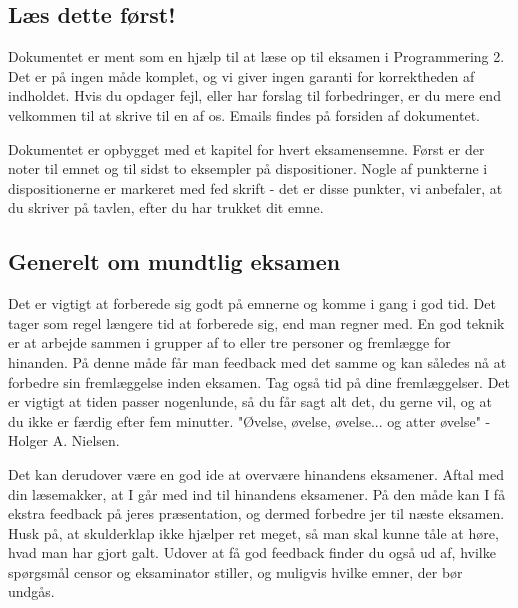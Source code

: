 \subsection{Læs dette først!}

Dokumentet er ment som en hjælp til at læse op til eksamen i Programmering 2. Det er på ingen måde komplet, og vi giver ingen garanti for korrektheden af indholdet. Hvis du opdager fejl, eller har forslag til forbedringer, er du mere end velkommen til at skrive til en af os. Emails findes på forsiden af dokumentet.

Dokumentet er opbygget med et kapitel for hvert eksamensemne. Først er der noter til emnet og til sidst to eksempler på dispositioner. Nogle af punkterne i dispositionerne er markeret med fed skrift - det er disse punkter, vi anbefaler, at du skriver på tavlen, efter du har trukket dit emne.

\subsection{Generelt om mundtlig eksamen}
Det er vigtigt at forberede sig godt på emnerne og komme i gang i god tid. Det tager som regel længere tid at forberede sig, end man regner med. En god teknik er at arbejde sammen i grupper af to eller tre personer og fremlægge for hinanden. På denne måde får man feedback med det samme og kan således nå at forbedre sin fremlæggelse inden eksamen. Tag også tid på dine fremlæggelser. Det er vigtigt at tiden passer nogenlunde, så du får sagt alt det, du gerne vil, og at du ikke er færdig efter fem minutter. "Øvelse, øvelse, øvelse... og atter øvelse" - Holger A. Nielsen.

Det kan derudover være en god ide at overvære hinandens eksamener. Aftal med din læsemakker, at I går med ind til hinandens eksamener. På den måde kan I få ekstra feedback på jeres præsentation, og dermed forbedre jer til næste eksamen. Husk på, at skulderklap ikke hjælper ret meget, så man skal kunne tåle at høre, hvad man har gjort galt. Udover at få god feedback finder du også ud af, hvilke spørgsmål censor og eksaminator stiller, og muligvis hvilke emner, der bør undgås.

